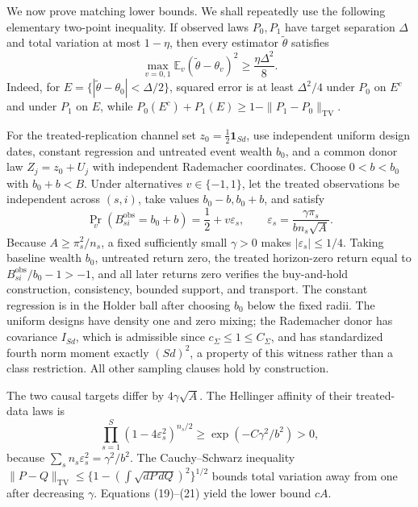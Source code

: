 We now prove matching lower bounds.  We shall repeatedly use the following
elementary two-point inequality.  If observed laws \(P_0,P_1\) have target
separation \(\Delta\) and total variation at most \(1-\eta\), then every
estimator \(\widetilde\theta\) satisfies
\[
 \max_{v=0,1}\mathbb E_v(\widetilde\theta-\theta_v)^2
 \ge\frac{\eta\Delta^2}{8}.                                  \tag{19}
\]
Indeed, for
\(E=\{|\widetilde\theta-\theta_0|<\Delta/2\}\), squared error is at least
\(\Delta^2/4\) under \(P_0\) on \(E^c\) and under \(P_1\) on \(E\), while
\(P_0(E^c)+P_1(E)\ge1-\|P_1-P_0\|_{\mathrm{TV}}\).

For the treated-replication channel set
\(z_0=\tfrac12\mathbf1_{Sd}\), use independent uniform design dates,
constant regression and untreated event wealth \(b_0\), and a common donor
law \(Z_j=z_0+U_j\) with independent Rademacher coordinates.  Choose
\(0<b<b_0\) with \(b_0+b<B\).  Under alternatives \(v\in\{-1,1\}\), let
the treated observations be independent across \((s,i)\), take values
\(b_0-b,b_0+b\), and satisfy
\[
 \Pr_v(B_{si}^{\mathrm{obs}}=b_0+b)=\frac12+v\varepsilon_s,
 \qquad
 \varepsilon_s=\frac{\gamma\pi_s}{bn_s\sqrt A}.              \tag{20}
\]
Because \(A\ge\pi_s^2/n_s\), a fixed sufficiently small \(\gamma>0\)
makes \(|\varepsilon_s|\le1/4\).  Taking baseline wealth \(b_0\), untreated
return zero, the treated horizon-zero return equal to
\(B_{si}^{\mathrm{obs}}/b_0-1>-1\), and all later returns zero verifies the
buy-and-hold construction, consistency, bounded support, and transport.
The constant regression is in the Holder ball after choosing \(b_0\) below
the fixed radii.  The uniform designs have density one and zero mixing; the
Rademacher donor has covariance \(I_{Sd}\), which is admissible since
\(c_\Sigma\le1\le C_\Sigma\), and has standardized fourth norm moment
exactly \((Sd)^2\), a property of this witness rather than a class
restriction.  All other sampling clauses hold by construction.

The two causal targets differ by \(4\gamma\sqrt A\).  The Hellinger affinity
of their treated-data laws is
\[
 \prod_{s=1}^{S}(1-4\varepsilon_s^2)^{n_s/2}
 \ge\exp(-C\gamma^2/b^2)>0,                                   \tag{21}
\]
because \(\sum_sn_s\varepsilon_s^2=\gamma^2/b^2\).  The
Cauchy--Schwarz inequality
\(\|P-Q\|_{\mathrm{TV}}
 \le\{1-(\int\sqrt{dP\,dQ})^2\}^{1/2}\) bounds total variation away from
one after decreasing \(\gamma\).  Equations (19)--(21) yield the lower bound
\(cA\).


